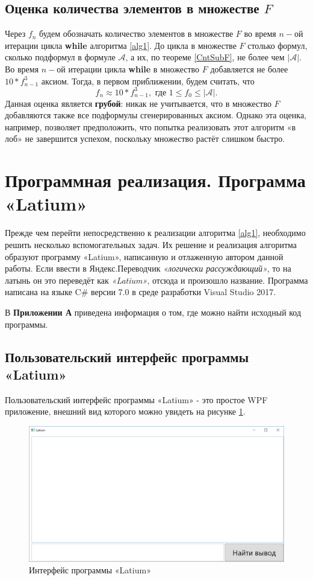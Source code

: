 \documentclass[a4paper,12pt]{article}
\theoremstyle{definition}
\begin{document}
	\subsection{Оценка количества элементов в множестве $ F $}
	Через $ f_{n} $ будем обозначать количество элементов в множестве $ F $ во время $ n- $ой итерации цикла \textbf{while} алгоритма \ref{alg1}. До цикла в множестве $ F $ столько формул, сколько подформул в формуле $ \mathcal{A} $, а их, по теореме \ref{CntSubF}, не более чем $ \left| \mathcal{A} \right| $. Во время $ n- $ой итерации цикла \textbf{while} в множество $ F $ добавляется не более $ 10 * f_{n-1}^3 $ аксиом. Тогда, в первом приближении, будем считать, что \[f_{n} \approx  10 * f_{n-1}^3, \text{ где } 1 \leq f_{0} \leq \left| \mathcal{A} \right|. \]
	Данная оценка является \textbf{грубой}: никак не учитывается, что в множество $ F $ добавляются также все подформулы сгенерированных аксиом. Однако эта оценка, например, позволяет предположить, что попытка реализовать этот алгоритм «в лоб» не завершится успехом, поскольку множество растёт слишком быстро.
	
	\section{Программная реализация. Программа «Latium»}
	Прежде чем перейти непосредственно к реализации алгоритма \ref{alg1}, необходимо решить несколько вспомогательных задач. Их решение и реализация алгоритма образуют программу «Latium», написанную и отлаженную автором данной работы. Если ввести в Яндекс.Переводчик \textit{«логически рассуждающий»}, то на латынь он это переведёт как \textit{«Latium»}, отсюда и произошло название. Программа написана на языке C\# версии 7.0 в среде разработки Visual Studio 2017.
	
	 В \textbf{Приложении А} приведена информация о том, где можно найти исходный код программы.
	
			
	\subsection{Пользовательский интерфейс программы «Latium»}
	Пользовательский интерфейс программы «Latium» - это простое WPF приложение, внешний вид которого можно увидеть на рисунке \ref{emptyWindow}.
	
	\begin{figure}[h]
		\begin{center}
			\includegraphics[width=0.8\linewidth]{emptyWindow}
		\end{center}
		\caption{Интерфейс программы «Latium»}
		\label{emptyWindow}
	\end{figure}
\end{document}
